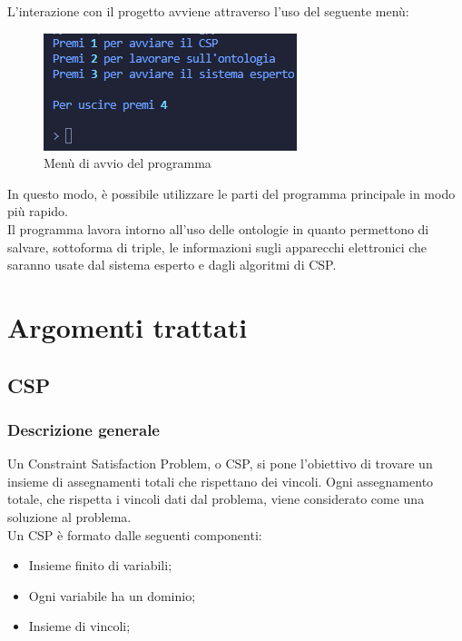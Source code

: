 \documentclass[12pt, letterpaper]{article}
\begin{document}
\noindent L'interazione con il progetto avviene attraverso l'uso del seguente menù:

\begin{figure}[h]
      \centering
      \includegraphics{menu-iniziale.png}
      \caption{Menù di avvio del programma}
\end{figure}

\noindent In questo modo, è possibile utilizzare le parti del programma principale in modo più rapido. \\

\noindent Il programma lavora intorno all'uso delle ontologie in quanto permettono di salvare, sottoforma di triple,
le informazioni sugli apparecchi elettronici che saranno usate dal sistema esperto e dagli algoritmi di CSP.


\newpage

\section{Argomenti trattati}

\subsection{CSP}

\subsubsection{Descrizione generale}

Un Constraint Satisfaction Problem, o CSP, si pone l'obiettivo di trovare un insieme di assegnamenti totali che
rispettano dei vincoli. Ogni assegnamento totale, che rispetta i vincoli dati dal problema,  viene considerato come
una soluzione al problema. \\

\noindent Un CSP è formato dalle seguenti componenti:
\begin{itemize}
      \item Insieme finito di variabili;
      \item Ogni variabile ha un dominio;
      \item Insieme di vincoli;
\end{itemize}
\end{document}
